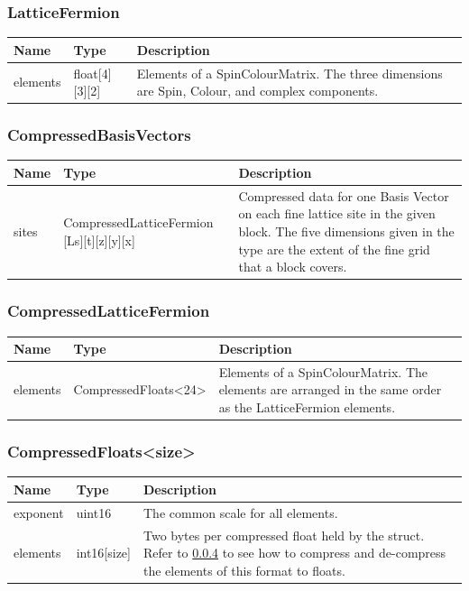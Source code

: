 \documentclass{article}
\begin{document}
\subsubsection{LatticeFermion}
\begin{tabular}{p{} |p{} |p{}}
\hline
Name & Type & Description\\
\hline
elements & float[4][3][2] & Elements of a SpinColourMatrix. The three dimensions are Spin, Colour, and complex components.\\
\hline
\end{tabular}

\subsubsection{CompressedBasisVectors}
\begin{tabular}{p{} |p{} |p{}}
\hline
Name & Type & Description\\
\hline
sites & CompressedLatticeFermion [Ls][t][z][y][x] & Compressed data for one Basis Vector on each fine lattice site in the given block. The five dimensions given in the type are the extent of the fine grid that a block covers.\\
\hline
\end{tabular}

\subsubsection{CompressedLatticeFermion}
\begin{tabular}{p{} |p{} |p{}}
\hline
Name & Type & Description\\
\hline
elements & CompressedFloats\textless 24\textgreater & Elements of a SpinColourMatrix. The elements are arranged in the same order as the LatticeFermion elements. \\
\hline
\end{tabular}

\subsubsection{CompressedFloats\textless size\textgreater}
\begin{tabular}{p{} |p{} |p{}}
\hline
Name & Type & Description\\
\hline
exponent & uint16 & The common scale for all elements.\\
elements & int16[size] &  Two bytes per compressed float held by the struct. Refer to \ref{} to see how to compress and de-compress the elements of this format to floats.\\
\hline
\end{tabular}
\end{document}

